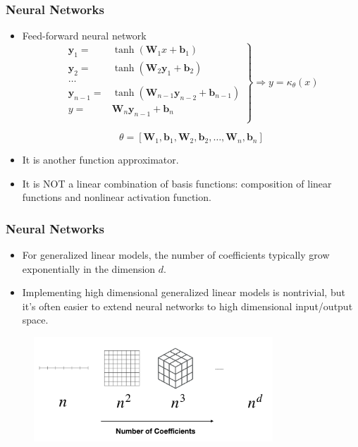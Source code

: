 \documentclass{beamer}
\newcommand{\by}{\mathbf{y}}
\begin{document}
\begin{frame}
\frametitle{Neural Networks}

\begin{itemize}
	\item Feed-forward neural network
	\begin{equation*}
\left.\begin{aligned}
\by_1 =& \tanh(\mathbf{W}_1 x + \mathbf{b}_1)\\
\by_2 =& \tanh(\mathbf{W}_2 \by_1 + \mathbf{b}_2)\\
\ldots\\
\by_{n-1} =& \tanh(\mathbf{W}_{n-1} \by_{n-2} + \mathbf{b}_{n-1})\\
y =& \mathbf{W}_n \by_{n-1} + \mathbf{b}_n\\
\end{aligned}  \right\} \Rightarrow y = \kappa_{\theta}(x)
\end{equation*}

$$\theta = [\mathbf{W}_1, \mathbf{b}_1, \mathbf{W}_2, \mathbf{b}_2, \ldots, \mathbf{W}_n, \mathbf{b}_n]$$

\item It is another function approximator.
\item It is NOT a linear combination of basis functions: composition of linear functions and nonlinear activation function. 
\end{itemize}

\end{frame}

\begin{frame}
	\frametitle{Neural Networks}

\begin{itemize}
	\item For generalized linear models, the number of coefficients typically grow exponentially in the dimension $d$.
	\item Implementing high dimensional  generalized linear models is nontrivial, but it's often easier to extend neural networks to high dimensional input/output space. 
\end{itemize}
\begin{figure}[hbt]
  \includegraphics[width=0.8\textwidth]{figures/coef}
\end{figure}


\end{frame}
\end{document}
